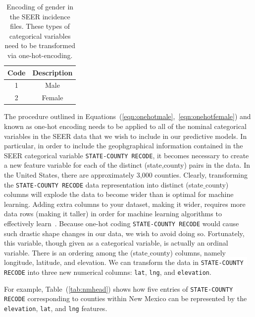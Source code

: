 \documentclass[a4paper,11pt]{article}
\newcommand{\codewhite}[1]{\colorbox{white}{\texttt{#1}}}
\begin{document}
\begin{table}[tbp]
\begin{center}
\begin{tabular}{cc}
\toprule
Code & Description \\ 
\midrule
1 & Male \\  
2 & Female \\  
\bottomrule
\end{tabular}
\caption{\label{tab:sex} Encoding of gender in the SEER incidence files. These types of categorical variables need to be transformed via one-hot-encoding.}
\end{center}
\end{table}


The procedure outlined in Equations~(\ref{eqn:onehotmale},~\ref{eqn:onehotfemale}) and known as one-hot encoding needs to be applied to all of the nominal categorical variables in the SEER data that we wish to include in our predictive models.
In particular, in order to include the geophgraphical information contained in the SEER categorical variable \codewhite{STATE-COUNTY RECODE}, it becomes necessary to create a new feature variable for each of the distinct (state,county) pairs in the data. In the United States, there are approximately 3,000 counties. Clearly, transforming the \codewhite{STATE-COUNTY RECODE} data representation into distinct (state$\_$county) columns will explode the data to become wider than is optimal for machine learning. Adding extra columns to your dataset, making it wider, requires more data rows (making it taller) in order for machine learning algorithms to effectively learn~\cite{bowles}. Because one-hot coding \codewhite{STATE-COUNTY RECODE} would cause such drastic shape changes in our data, we wish to avoid doing so. Fortunately, this variable, though given as a categorical variable, is actually an ordinal variable. There is an ordering among the (state$\_$county) columns, namely longitude, latitude, and elevation. We can transform the data in \codewhite{STATE-COUNTY RECODE} into three new numerical columns: \codewhite{lat}, \codewhite{lng}, and \codewhite{elevation}.

For example, Table~(\ref{tab:nmhead}) shows how five entries of \codewhite{STATE-COUNTY RECODE} corresponding to counties within New Mexico can be represented by the 
\codewhite{elevation}, \codewhite{lat}, and \codewhite{lng} features.
\end{document}
